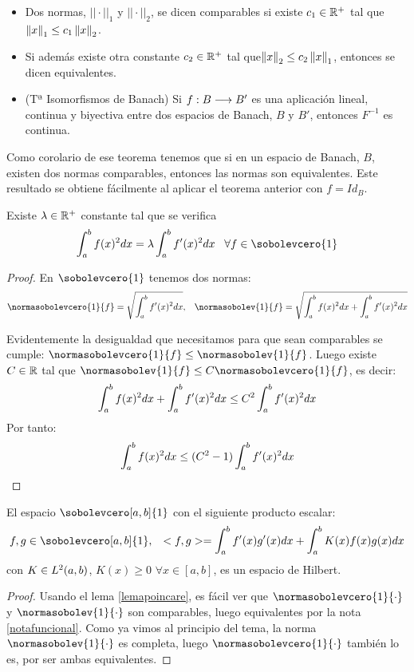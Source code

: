 \begin{remark}
\begin{itemize}
\label{notafuncional}
\item Dos normas, $||\cdot||_1$ y $||\cdot||_2$, se dicen comparables si existe $c_1\in\mathbb{R}^+$ tal que $\left\lVert x\right\rVert_1\leq c_1\left\lVert x\right\rVert_2$.
\item Si además existe otra constante $c_2\in\mathbb{R}^+$ tal que$\left\lVert x\right\rVert_2\leq c_2\left\lVert x\right\rVert_1$, entonces se dicen equivalentes.
\item (Tª Isomorfismos de Banach) Si $f : B \longrightarrow B'$ es una aplicación lineal, continua y biyectiva entre dos espacios de Banach, $B$ y $B'$, entonces $F^{-1}$ es continua.
\end{itemize}

Como corolario de ese teorema tenemos que si en un espacio de Banach, $B$, existen dos normas comparables, entonces las normas son equivalentes. Este resultado se obtiene fácilmente al aplicar el teorema anterior con $f=Id_B$.
\end{remark}

\begin{prop}
\label{lemapoincare}
Existe $\lambda\in\mathbb{R}^+$ constante tal que se verifica
\[
\integral{a}{b}{f(x)^2dx}=\lambda\integral{a}{b}{f'(x)^2dx} \espacio \forall f\in\sobolevcero{1}
\]
\end{prop}

\begin{proof}

En $\sobolevcero{1}$ tenemos dos normas:
\[
\normasobolevcero{1}{f} = \sqrt{\integral{a}{b}{f'(x)^2dx}}, \espacio \normasobolev{1}{f}=\sqrt{\integral{a}{b}{f(x)^2dx}+\integral{a}{b}{f'(x)^2dx}}
\]

Evidentemente la desigualdad que necesitamos para que sean comparables se cumple: $\normasobolevcero{1}{f}\leq \normasobolev{1}{f}$. Luego existe $C\in\mathbb{R}$ tal que $\normasobolev{1}{f}\leq C\normasobolevcero{1}{f}$, es decir:
\[
\displaystyle\int_{ a }^{ b } f(x)^2dx+\displaystyle\int_{ a }^{ b } f'(x)^2dx\leq C^2\displaystyle\int_{ a }^{ b } f'(x)^2dx
\]
Por tanto:
\[
\displaystyle\int_{ a }^{ b } f(x)^2dx\leq (C^2-1)\displaystyle\int_{ a }^{ b } f'(x)^2dx
\]

\end{proof}

\begin{prop}
El espacio $\sobolevcero[a,b]{1}$ con el siguiente producto escalar:
\[
f,g\in\sobolevcero[a,b]{1}, \espacio <f,g>=\integral{a}{b}{f'(x)g'(x)dx}+\integral{a}{b}{K(x)f(x)g(x)dx}
\]
con $K\in L^{ 2 }(a,b)$, $K(x)\geq 0$ $\forall x\in[a,b]$, es un espacio de Hilbert.
\end{prop}
\begin{proof}
Usando el lema \ref{lemapoincare}, es fácil ver que $\normasobolevcero{1}{\cdot}$ y $\normasobolev{1}{\cdot}$ son comparables, luego equivalentes por la nota \ref{notafuncional}. Como ya vimos al principio del tema, la norma $\normasobolev{1}{\cdot}$ es completa, luego $\normasobolevcero{1}{\cdot}$ también lo es, por ser ambas equivalentes.
\end{proof}

